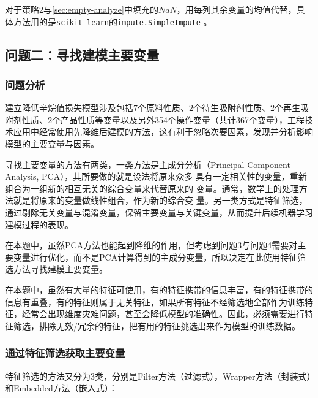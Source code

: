 \documentclass[bwprint]{gmcmthesis}
\begin{document}
对于策略2与\ref{sec:empty-analyze}中填充的$NaN$，用每列其余变量的均值代替，具体方法用的是\texttt{scikit-learn}的\texttt{impute.SimpleImpute} 。

\FloatBarrier
\subsection{问题二：寻找建模主要变量}
\FloatBarrier
\subsubsection{问题分析}

建立降低辛烷值损失模型涉及包括7个原料性质、2个待生吸附剂性质、2个再生吸附剂性质、2个产品性质等变量以及另外354个操作变量（共计367个变量），工程技术应用中经常使用先降维后建模的方法，这有利于忽略次要因素，发现并分析影响模型的主要变量与因素。

寻找主要变量的方法有两类，一类方法是主成分分析（Principal Component Analysis, PCA），其所要做的就是设法将原来众多
具有一定相关性的变量，重新组合为一组新的相互无关的综合变量来代替原来的
变量。通常，数学上的处理方法就是将原来的变量做线性组合，作为新的综合变
量。另一类方式是特征筛选，通过剔除无关变量与混淆变量，保留主要变量与关键变量，从而提升后续机器学习建模过程的表现。

在本题中，虽然PCA方法也能起到降维的作用，但考虑到问题3与问题4需要对主要变量进行优化，而不是PCA计算得到的主成分变量，所以决定在此使用特征筛选方法寻找建模主要变量。

在本题中，虽然有大量的特征可使用，有的特征携带的信息丰富，有的特征携带的信息有重叠，有的特征则属于无关特征，如果所有特征不经筛选地全部作为训练特征，经常会出现维度灾难问题，甚至会降低模型的准确性。因此，必须需要进行特征筛选，排除无效/冗余的特征，把有用的特征挑选出来作为模型的训练数据。



\FloatBarrier
\subsubsection{通过特征筛选获取主要变量}\label{sec:feature-selection}

特征筛选的方法又分为3类，分别是Filter方法（过滤式），Wrapper方法（封装式）和Embedded方法（嵌入式）：
\end{document}
